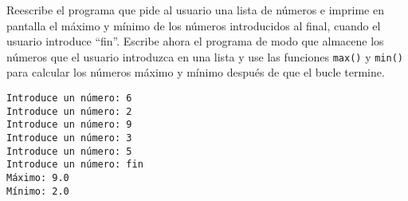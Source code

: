 \begin{ex}
Reescribe el programa que pide al usuario una lista de números
e imprime en pantalla el máximo y mínimo de los números
introducidos al final, cuando el usuario introduce ``fin''.
Escribe ahora el programa de modo que almacene los números que el usuario
introduzca en una lista y use las funciones {\tt max()} y {\tt min()} para
calcular los números máximo y mínimo después de que el
bucle termine.

\beforeverb
\begin{verbatim}
Introduce un número: 6
Introduce un número: 2
Introduce un número: 9
Introduce un número: 3
Introduce un número: 5
Introduce un número: fin
Máximo: 9.0
Mínimo: 2.0
\end{verbatim}
\afterverb
%

\end{ex}